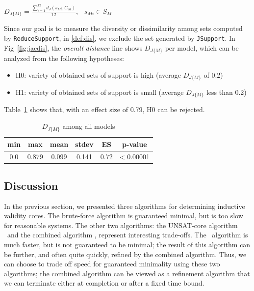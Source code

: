 \begin{definition}
  \label{def:dis}
  $D_{J\{M\}} =  \frac{\sum_{i=1}^{12}d_J(s_{Mi}, C_M)}{12},   \hspace{9pt} s_{Mi} \in S_M$
\end{definition}

Since our goal is to measure the diversity or dissimilarity among sets computed by \texttt{ReduceSupport}, in \ref{def:dis}, we exclude the set generated by \texttt{JSupport}. In Fig~\ref{fig:jacdis}, the \emph{overall distance} line shows $D_{J\{M\}}$ per model, which can be analyzed from the following hypotheses:
\begin{itemize}
  \item H0: variety of obtained sets of support is high (average $D_{J\{M\}}$ of 0.2)
  \item H1: variety of obtained sets of support is small (average $D_{J\{M\}}$ less than 0.2)
\end{itemize}
Table~\ref{tab:variety} shows that, with an effect size of 0.79, H0 can be rejected.
\begin{table}
  \centering
  \begin{tabular}{ |c|c|c|c|c|c| }
    \hline
     min & max & mean & stdev & ES & p-value\\[0.5ex]
    \hline
     0.0   & 0.879 & 0.099 & 0.141 & 0.72 & < 0.00001 \\[0.5ex]
    \hline
  \end{tabular}
  \caption{$D_{J\{M\}}$ among all models}
  \label{tab:variety}
\end{table}
\fi


\subsection{Discussion}

In the previous section, we presented three algorithms for determining inductive validity cores.  The brute-force algorithm is guaranteed minimal, but is too slow for reasonable systems.  The other two algorithms: the UNSAT-core algorithm \ucalg\ and the combined algorithm \ucbfalg, represent interesting trade-offs.  The \ucalg\ algorithm is much faster, but is not guaranteed to be minimal; the result of this algorithm can be further, and often quite quickly, refined by the combined algorithm.  Thus, we can choose to trade off speed for guaranteed minimality using these two algorithms; the combined algorithm can be viewed as a refinement algorithm that we can terminate either at completion or after a fixed time bound.


